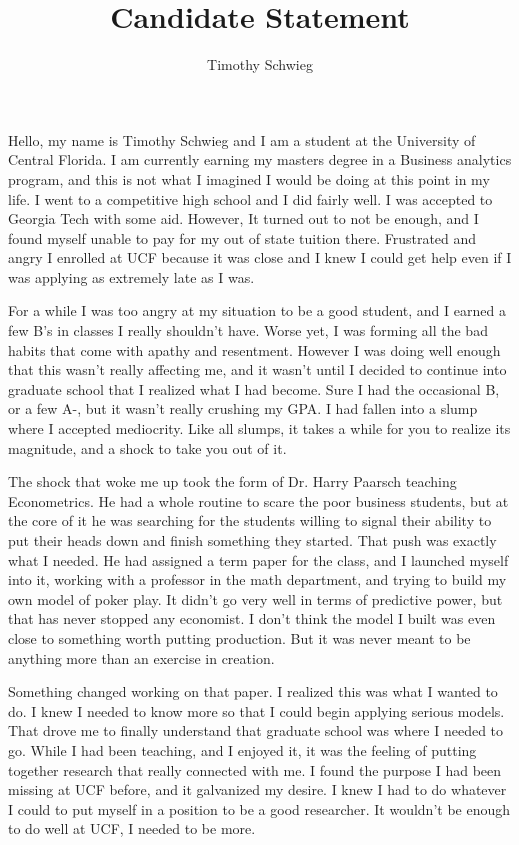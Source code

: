 \documentclass[10pt, a4paper]{article}
\author{Timothy Schwieg}
\date{}
\title{Candidate Statement}
\begin{document}
\maketitle
Hello, my name is Timothy Schwieg and I am a student at the University
of Central Florida. I am currently earning my masters degree in a
Business analytics program, and this is not what I imagined I would be
doing at this point in my life. I went to a competitive high school
and I did fairly well. I was accepted to Georgia Tech with some
aid. However, It turned out to not be enough, and I found myself
unable to pay for my out of state tuition there. Frustrated and angry
I enrolled at UCF because it was close and I knew I could get help
even if I was applying as extremely late as I was.

For a while I was too angry at my situation to be a good student, and
I earned a few B's in classes I really shouldn't have. Worse yet, I
was forming all the bad habits that come with apathy and
resentment. However I was doing well enough that this wasn't really
affecting me, and it wasn't until I decided to continue into graduate
school that I realized what I had become. Sure I had the occasional B,
or a few A-, but it wasn't really crushing my GPA. I had fallen into a
slump where I accepted mediocrity. Like all slumps, it takes a while
for you to realize its magnitude, and a shock to take you out of it.

The shock that woke me up took the form of Dr. Harry Paarsch teaching
Econometrics. He had a whole routine to scare the poor
business students, but at the core of it he was searching for the
students willing to signal their ability to put their heads down and
finish something they started. That push was exactly what I needed. He
had assigned a term paper for the class, and I launched myself into
it, working with a professor in the math department, and trying to
build my own model of poker play. It didn't go very well in terms of
predictive power, but that has never stopped any economist. I don't
think the model I built was even close to something worth putting
production. But it was never meant to be anything more than an
exercise in creation.

Something changed working on that paper. I realized this was what I
wanted to do. I knew I needed to know more so that I could begin
applying serious models. That drove me to finally understand that
graduate school was where I needed to go. While I had been teaching, and I enjoyed it,
it was the feeling of putting together research that really connected
with me. I found the purpose I had been missing at UCF before, and it
galvanized my desire. I knew I had to do whatever I could to put
myself in a position to be a good researcher. It wouldn't be enough to
do well at UCF, I needed to be more.
\end{document}
